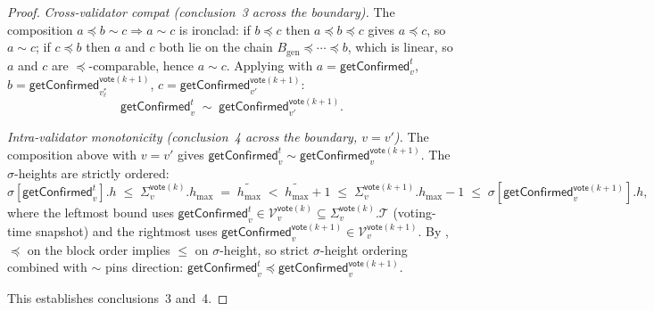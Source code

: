 \ifx\litemode\undefined\documentclass{article}\fi
\newcommand{\genesis}{\ensuremath{B_{\mathrm{gen}}}}
\newcommand{\T}[0]{\ensuremath{\mathcal{T}}}
\newcommand{\V}[0]{\ensuremath{\mathcal{V}}}
\newcommand{\hmax}{\ensuremath{h_{\max}}\xspace}
\newcommand{\vote}{\ensuremath{\mathsf{vote}}}
\newcommand{\comm}[1]{\ensuremath{\widetilde{#1}}}
\newcommand{\getConfirmed}{\textsf{getConfirmed}\xspace}
\theoremstyle{plain}
\theoremstyle{definition}
\theoremstyle{remark}
\begin{document}
\begin{proof}
\emph{Cross-validator compat (conclusion~3 across the boundary).}
The composition $a \preceq b \sim c \Rightarrow a \sim c$ is ironclad: if $b \preceq c$ then $a \preceq b \preceq c$ gives $a \preceq c$, so $a \sim c$; if $c \preceq b$ then $a$ and $c$ both lie on the chain $\genesis \preceq \cdots \preceq b$, which is linear, so $a$ and $c$ are $\preceq$-comparable, hence $a \sim c$. Applying with $a = \getConfirmed_v^{t}$, $b = \getConfirmed_{v_\ell^{\ast}}^{\vote(k+1)}$, $c = \getConfirmed_{v'}^{\vote(k+1)}$:
\[
  \getConfirmed_v^{t} \;\sim\; \getConfirmed_{v'}^{\vote(k+1)}.
\]

\emph{Intra-validator monotonicity (conclusion~4 across the boundary, $v = v'$).}
The composition above with $v = v'$ gives $\getConfirmed_v^{t} \sim \getConfirmed_v^{\vote(k+1)}$. The $\sigma$-heights are strictly ordered:
\[
  \sigma[\getConfirmed_v^{t}].h \;\leq\; \Sigma_v^{\vote(k)}.\hmax \;=\; \comm{\hmax} \;<\; \comm{\hmax}+1 \;\leq\; \Sigma_v^{\vote(k+1)}.\hmax - 1 \;\leq\; \sigma[\getConfirmed_v^{\vote(k+1)}].h,
\]
where the leftmost bound uses $\getConfirmed_v^{t} \in \V_v^{\vote(k)} \subseteq \Sigma_v^{\vote(k)}.\T$ (voting-time snapshot) and the rightmost uses $\getConfirmed_v^{\vote(k+1)} \in \V_v^{\vote(k+1)}$. By , $\preceq$ on the block order implies $\leq$ on $\sigma$-height, so strict $\sigma$-height ordering combined with $\sim$ pins direction: $\getConfirmed_v^{t} \preceq \getConfirmed_v^{\vote(k+1)}$.

This establishes conclusions~3 and~4.
\end{proof}
\end{document}
